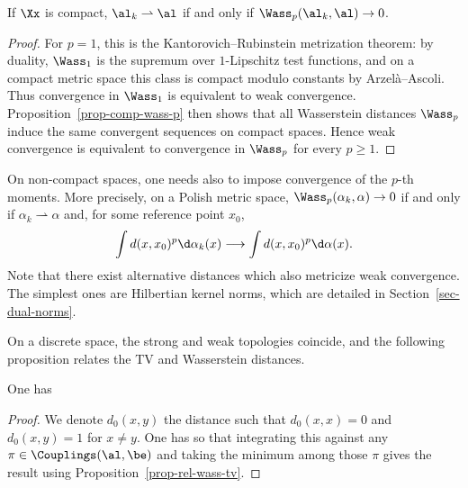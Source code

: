 \begin{prop}\label{prop-wass-metrizes-weak-compact}
	If $\Xx$ is compact, $\al_k \rightharpoonup \al$ if and only if $\Wass_p(\al_k,\al) \rightarrow 0$.
\end{prop}
\begin{proof}
	For $p=1$, this is the Kantorovich--Rubinstein metrization theorem: by duality, $\Wass_1$ is the supremum over $1$-Lipschitz test functions, and on a compact metric space this class is compact modulo constants by Arzel\`a--Ascoli. Thus convergence in $\Wass_1$ is equivalent to weak convergence. Proposition~\ref{prop-comp-wass-p} then shows that all Wasserstein distances $\Wass_p$ induce the same convergent sequences on compact spaces. Hence weak convergence is equivalent to convergence in $\Wass_p$ for every $p\geq1$.
\end{proof}

On non-compact spaces, one needs also to impose convergence of the $p$-th moments. More precisely, on a Polish metric space, $\Wass_p(\alpha_k,\alpha)\to0$ if and only if $\alpha_k\rightharpoonup\alpha$ and, for some reference point $x_0$,
\[
	\int d(x,x_0)^p\d\alpha_k(x)\longrightarrow
	\int d(x,x_0)^p\d\alpha(x).
\]
%
Note that there exist alternative distances which also metricize weak convergence. The simplest ones are Hilbertian kernel norms, which are detailed in Section~\ref{sec-dual-norms}.

On a discrete space, the strong and weak topologies coincide, and the following proposition relates the TV and Wasserstein distances.

\begin{prop}
	One has
\end{prop}

\begin{proof}
	We denote $d_0(x,y)$ the distance such that $d_0(x,x)=0$ and $d_0(x,y)=1$ for $x \neq y$. One has
	so that integrating this against any $\pi \in \Couplings(\al,\be)$ and taking the minimum among those $\pi$ gives the result using Proposition~\ref{prop-rel-wass-tv}.
\end{proof}

